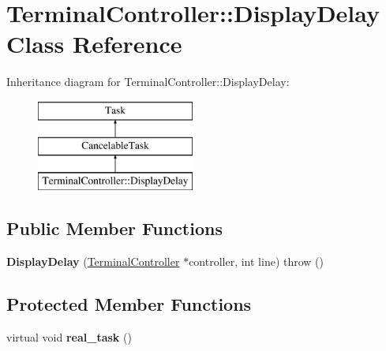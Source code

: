 \hypertarget{classTerminalController_1_1DisplayDelay}{
\section{TerminalController::DisplayDelay Class Reference}
\label{classTerminalController_1_1DisplayDelay}
}
Inheritance diagram for TerminalController::DisplayDelay:\begin{figure}[H]
\begin{center}
\leavevmode
\includegraphics[height=3cm]{classTerminalController_1_1DisplayDelay}
\end{center}
\end{figure}
\subsection*{Public Member Functions}
\begin{DoxyCompactItemize}
\item 
\hypertarget{classTerminalController_1_1DisplayDelay_a1b2a24dac56b2f23c17e8dd2ef1e3d75}{
{\bfseries DisplayDelay} (\hyperlink{classTerminalController}{TerminalController} $\ast$controller, int line)  throw ()}
\label{classTerminalController_1_1DisplayDelay_a1b2a24dac56b2f23c17e8dd2ef1e3d75}

\end{DoxyCompactItemize}
\subsection*{Protected Member Functions}
\begin{DoxyCompactItemize}
\item 
\hypertarget{classTerminalController_1_1DisplayDelay_abe0f542df1df0437944ece955879da69}{
virtual void {\bfseries real\_\-task} ()}
\label{classTerminalController_1_1DisplayDelay_abe0f542df1df0437944ece955879da69}

\end{DoxyCompactItemize}
